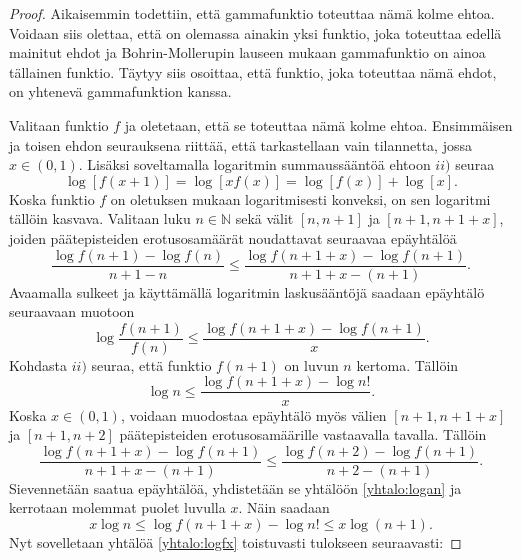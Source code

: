 \documentclass[12pt]{article}
\theoremstyle{definition}
\theoremstyle{plain}
\numberwithin{equation}{section}
\begin{document}
\begin{proof}
Aikaisemmin todettiin, että gammafunktio toteuttaa nämä kolme ehtoa. Voidaan siis olettaa, että on olemassa ainakin yksi funktio, joka toteuttaa edellä mainitut ehdot ja  Bohrin-Mollerupin lauseen mukaan gammafunktio on ainoa tällainen funktio. Täytyy siis osoittaa, että funktio, joka toteuttaa nämä ehdot, on yhtenevä gammafunktion kanssa.

Valitaan funktio $f$ ja oletetaan, että se toteuttaa nämä kolme ehtoa. Ensimmäisen ja toisen ehdon seurauksena riittää, että tarkastellaan vain tilannetta, jossa $x\in (0,1)$. Lisäksi soveltamalla logaritmin summaussääntöä ehtoon $ii)$ seuraa
\begin{equation} \label{yhtalo:logfx}
    \log [f(x+1)]=\log[xf(x)]=\log [f(x)]+\log[x].
\end{equation}
Koska funktio $f$ on oletuksen mukaan logaritmisesti konveksi, on sen logaritmi tällöin kasvava. Valitaan luku $n\in\mathbb{N}$ sekä välit $[n,n+1]$ ja $[n+1,n+1+x]$, joiden päätepisteiden erotusosamäärät noudattavat seuraavaa epäyhtälöä
\begin{equation*}
    \frac{\log f(n+1)-\log f(n)}{n+1-n}\le\frac{\log f(n+1+x)-\log f(n+1)}{n+1+x-(n+1)}.
\end{equation*}
Avaamalla sulkeet ja käyttämällä logaritmin laskusääntöjä saadaan epäyhtälö seuraavaan muotoon
\begin{equation*}
    \log \frac{f(n+1)}{f(n)} \le \frac{\log f(n+1+x)-\log f(n+1)}{x}.
\end{equation*}
Kohdasta $ii)$ seuraa, että funktio $f(n+1)$ on luvun $n$ kertoma. Tällöin 
\begin{equation} \label{yhtalo:logan}
    \log n \le \frac{\log f(n+1+x)-\log n!}{x}.
\end{equation}
Koska $x\in(0,1)$, voidaan muodostaa epäyhtälö myös välien $[n+1,n+1+x]$ ja $[n+1, n+2]$ päätepisteiden erotusosamäärille vastaavalla tavalla. Tällöin
\begin{equation*}
    \frac{\log f(n+1+x)-\log f(n+1)}{n+1+x-(n+1)}\le\frac{\log f(n+2)-\log f(n+1)}{n+2-(n+1)}.
\end{equation*}
Sievennetään saatua epäyhtälöä, yhdistetään se yhtälöön \eqref{yhtalo:logan} ja kerrotaan molemmat puolet luvulla $x$. Näin saadaan
\begin{equation} \label{yhtalo:epayhtalo}
    x\log n \le \log f(n+1+x) -\log n! \le x\log (n+1).
\end{equation}
Nyt sovelletaan yhtälöä \eqref{yhtalo:logfx} toistuvasti tulokseen seuraavasti:

\end{proof}
\end{document}
